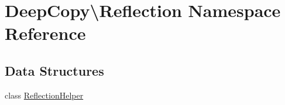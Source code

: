 \hypertarget{namespace_deep_copy_1_1_reflection}{}\section{Deep\+Copy\textbackslash{}Reflection Namespace Reference}
\label{namespace_deep_copy_1_1_reflection}
\subsection*{Data Structures}
\begin{DoxyCompactItemize}
\item 
class \mbox{\hyperlink{class_deep_copy_1_1_reflection_1_1_reflection_helper}{Reflection\+Helper}}
\end{DoxyCompactItemize}
